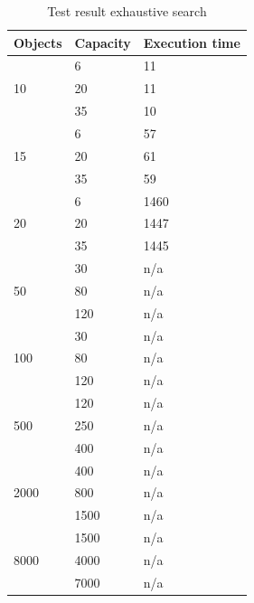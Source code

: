 \documentclass{inc/mas}
\begin{document}
\begin{table}
\begin{center}
\caption{Test result exhaustive search}
\begin{tabular}{|l|l|l|} \hline
Objects &Capacity &Execution time\\ \hline
\multirow{3}{*}{10} & 6 & 11 \\
& 20 & 11 \\
& 35 & 10 \\ \hline
\multirow{3}{*}{15} & 6 & 57 \\
& 20 & 61 \\
& 35 & 59 \\ \hline
\multirow{3}{*}{20} & 6 & 1460 \\
& 20 & 1447 \\
& 35 & 1445 \\ \hline
\multirow{3}{*}{50} & 30 & n/a \\
& 80 & n/a \\
& 120 & n/a \\ \hline
\multirow{3}{*}{100} & 30 &  n/a\\
& 80 & n/a \\
& 120 & n/a \\ \hline
\multirow{3}{*}{500} & 120 & n/a \\
& 250 & n/a \\
& 400 & n/a \\ \hline
\multirow{3}{*}{2000} & 400 & n/a \\
& 800 & n/a \\
& 1500 & n/a \\ \hline
\multirow{3}{*}{8000} & 1500 & n/a \\
& 4000 & n/a \\
& 7000 & n/a \\ \hline
\end{tabular}
\end{center}
\end{table}
\end{document}
